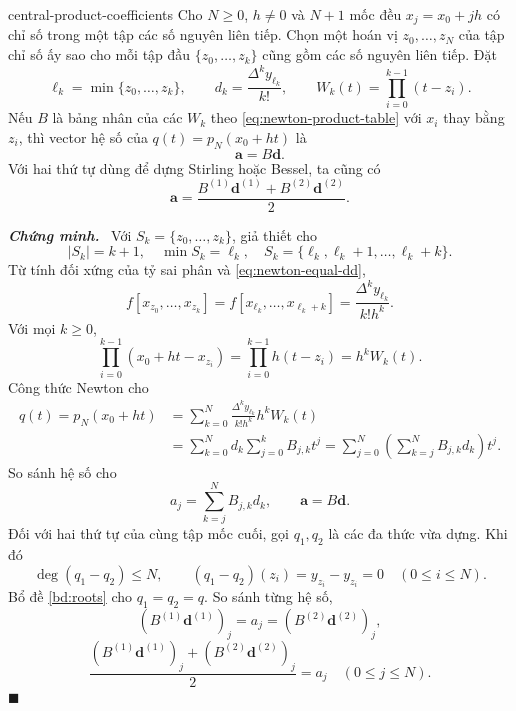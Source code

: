 \documentclass[12pt,a4paper,oneside]{book}
\numberwithin{algorithm}{chapter}
\theoremstyle{definition}
\newenvironment{chungminh}{\par\medskip\noindent\textbf{\textit{\color{mainblue}Chứng minh.}}\ }{\hfill$\blacksquare$\par\medskip}
\begin{document}
\begin{menhde}{}{central-product-coefficients}
Cho $N\geq0$, $h\ne0$ và $N+1$ mốc đều $x_j=x_0+jh$ có chỉ số trong một tập các số nguyên liên tiếp. Chọn một hoán vị $z_0,\ldots,z_N$ của tập chỉ số ấy sao cho mỗi tập đầu $\{z_0,\ldots,z_k\}$ cũng gồm các số nguyên liên tiếp. Đặt
\[
 \ell_k=\min\{z_0,\ldots,z_k\},\qquad
 d_k=\frac{\Delta^ky_{\ell_k}}{k!},\qquad
 W_k(t)=\prod_{i=0}^{k-1}(t-z_i).
\]
Nếu $B$ là bảng nhân của các $W_k$ theo \eqref{eq:newton-product-table} với $x_i$ thay bằng $z_i$, thì vector hệ số của $q(t)=p_N(x_0+ht)$ là
\[
 \boldsymbol a=B\boldsymbol d.
\]
Với hai thứ tự dùng để dựng Stirling hoặc Bessel, ta cũng có
\[
 \boldsymbol a=\frac{B^{(1)}\boldsymbol d^{(1)}+
 B^{(2)}\boldsymbol d^{(2)}}2.
\]
\end{menhde}
\begin{chungminh}
Với $S_k=\{z_0,\ldots,z_k\}$, giả thiết cho
\[
 |S_k|=k+1,\quad\min S_k=\ell_k,
 \quad S_k=\{\ell_k,\ell_k+1,\ldots,\ell_k+k\}.
\]
Từ tính đối xứng của tỷ sai phân và \eqref{eq:newton-equal-dd},
\[
 f[x_{z_0},\ldots,x_{z_k}]
 =f[x_{\ell_k},\ldots,x_{\ell_k+k}]
 =\frac{\Delta^ky_{\ell_k}}{k!h^k}.
\]
Với mọi $k\geq0$,
\[
 \prod_{i=0}^{k-1}(x_0+ht-x_{z_i})
 =\prod_{i=0}^{k-1}h(t-z_i)=h^kW_k(t).
\]
Công thức Newton cho
\begin{align*}
 q(t)=p_N(x_0+ht)
 &=\sum_{k=0}^{N}\frac{\Delta^ky_{\ell_k}}{k!h^k}h^kW_k(t)\\
 &=\sum_{k=0}^{N}d_k\sum_{j=0}^{k}B_{j,k}t^j
 =\sum_{j=0}^{N}\left(\sum_{k=j}^{N}B_{j,k}d_k\right)t^j.
\end{align*}
So sánh hệ số cho
\[
 a_j=\sum_{k=j}^{N}B_{j,k}d_k,\qquad\boldsymbol a=B\boldsymbol d.
\]
Đối với hai thứ tự của cùng tập mốc cuối, gọi $q_1,q_2$ là các đa thức vừa dựng. Khi đó
\[
 \deg(q_1-q_2)\leq N,\qquad
 (q_1-q_2)(z_i)=y_{z_i}-y_{z_i}=0\quad(0\leq i\leq N).
\]
Bổ đề \ref{bd:roots} cho $q_1=q_2=q$. So sánh từng hệ số,
\[
 (B^{(1)}\boldsymbol d^{(1)})_j=a_j
 =(B^{(2)}\boldsymbol d^{(2)})_j,
\]
\[
 \frac{(B^{(1)}\boldsymbol d^{(1)})_j
       +(B^{(2)}\boldsymbol d^{(2)})_j}{2}=a_j
 \quad(0\leq j\leq N).
\]
\end{chungminh}
\end{document}

